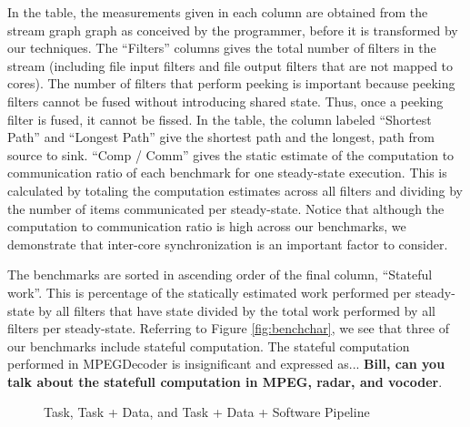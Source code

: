 In the table, the measurements given in each column are obtained from
the stream graph graph as conceived by the programmer, before it is
transformed by our techniques.  The ``Filters'' columns gives the
total number of filters in the stream (including file input filters
and file output filters that are not mapped to cores).  The number of
filters that perform peeking is important because peeking filters
cannot be fused without introducing shared state.  Thus, once a
peeking filter is fused, it cannot be fissed. In the table, the column
labeled ``Shortest Path'' and ``Longest Path'' give the shortest path
and the longest, path from source to sink. ``Comp / Comm'' gives the
static estimate of the computation to communication ratio of each
benchmark for one steady-state execution. This is calculated by
totaling the computation estimates across all filters and dividing by
the number of items communicated per steady-state. Notice that
although the computation to communication ratio is high across our
benchmarks, we demonstrate that inter-core synchronization is an
important factor to consider.

The benchmarks are sorted in ascending order of the final column,
``Stateful work''. This is percentage of the statically estimated work
performed per steady-state by all filters that have state divided by
the total work performed by all filters per steady-state.  Referring
to Figure \ref{fig:benchchar}, we see that three of our benchmarks
include stateful computation.  The stateful computation performed in
MPEGDecoder is insignificant and expressed as...
\textbf{Bill, can you talk about the statefull computation in
MPEG, radar, and vocoder}.


\begin{figure*}[t]
\centering
{}
\caption{Task, Task + Data, and Task + Data + Software Pipeline
\protect\label{fig:main_comp}}
\end{figure*}

